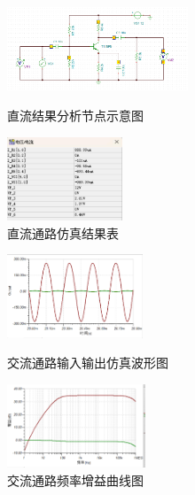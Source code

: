 \documentclass[]{article}
\begin{document}
\begin{figure}[h]
	\centering
	
	\begin{minipage}{0.4\linewidth}
		\centering
		\includegraphics[height=2.5cm]{img/4_3}
		\caption{直流结果分析节点示意图}
	\end{minipage}
	\begin{minipage}{0.4\linewidth}
		\centering
		\includegraphics[height=2.5cm]{img/4_4}
		\caption{直流通路仿真结果表}
	\end{minipage}
	
\end{figure}

\begin{figure}[h]
	\centering
	
	\begin{minipage}{0.4\linewidth}
		\centering
		\includegraphics[height=2.5cm]{img/4_5}
		\caption{交流通路输入输出仿真波形图}
	\end{minipage}
	\begin{minipage}{0.4\linewidth}
		\centering
		\includegraphics[height=2.5cm]{img/4_6}
		\caption{交流通路频率增益曲线图}
	\end{minipage}
	
\end{figure}
\end{document}
